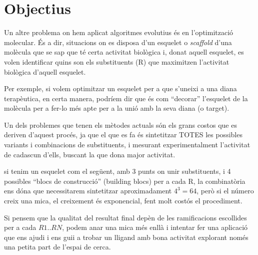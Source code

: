%

\section{Objectius} %
	\label{sec:Introduccio}
	Un altre problema on hem aplicat algoritmes evolutius és en l'optimització
	molecular.  És a dir, situacions on es disposa d'un esquelet o
	\textit{scaffold} d'una molècula que se sap que té certa activitat biològica
	i, donat aquell esquelet, es volen identificar quins son els substituents
	(R) que maximitzen l'activitat biològica d'aquell esquelet.	

	Per exemple, si volem optimitzar un esquelet per a que s'uneixi a una diana
	terapèutica, en certa manera, podríem dir que és com ``decorar'' l'esquelet
	de la molècula per a fer-lo més apte per a la unió amb la seva diana (o
	target).

	Un dels problemes que tenen els mètodes actuals són els grans costos
	que es deriven d'aquest procés, ja que el que es fa és sintetitzar TOTES les
	possibles variants i combinacions de substituents, i mesurant
	experimentalment l'activitat de cadascun d'ells, buscant la que dona major
	activitat.

	si tenim un esquelet com el següent, amb 3 punts on unir substituents,
	i 4 possibles ``blocs de construcció'' (building blocs) per a cada R, la
	combinatòria ens dóna que necessitarem sintetitzar aproximadament $4^3 =
	64 $, però si el número creix una mica, el creixement és exponencial, fent
	molt costós el procediment.

	Si pensem que la qualitat del resultat final depèn de les
	ramificacions escollides per a cada $R1..RN$, podem anar una mica més enllà i
	intentar fer una aplicació que ens ajudi i ens guii a trobar un lligand amb
	bona activitat explorant només una petita part de l'espai de cerca.
	
